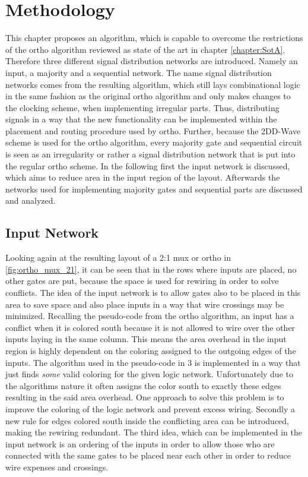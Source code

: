 \chapter{Methodology}\label{chapter:Methodology}
This chapter proposes an algorithm, which is capable to overcome the restrictions of the ortho algorithm reviewed as state of the art in chapter \ref{chapter:SotA}. Therefore three different signal distribution networks are introduced. Namely an input, a majority and a sequential network. The name signal distribution networks comes from the resulting algorithm, which still lays combinational logic in the same fashion as the original ortho algorithm and only makes changes to the clocking scheme, when implementing irregular parts. Thus, distributing signals in a way that the new functionality can be implemented within the placement and routing procedure used by ortho. Further, because the 2DD-Wave scheme is used for the ortho algorithm, every majority gate and sequential circuit is seen as an irregularity or rather a signal distribution network that is put into the regular ortho scheme. In the following first the input network is discussed, which aims to reduce area in the input region of the layout. Afterwards the networks used for implementing majority gates and sequential parts are discussed and analyzed.

\section{Input Network}
Looking again at the resulting layout of a 2:1 mux or ortho in \ref{fig:ortho_mux_21}, it can be seen that in the rows where inputs are placed, no other gates are put, because the space is used for rewiring in order to solve conflicts. The idea of the input network is to allow gates also to be placed in this area to save space and also place inputs in a way that wire crossings may be minimized. Recalling the pseudo-code from the ortho algorithm, an input has a conflict when it is colored south because it is not allowed to wire over the other inputs laying in the same column. This means the area overhead in the input region is highly dependent on the coloring assigned to the outgoing edges of the inputs. The algorithm used in the pseudo-code in $3$ is implemented in a way that just finds \textit{some} valid coloring for the given logic network. Unfortunately due to the algorithms nature it often assigns the color south to exactly these edges resulting in the said area overhead. One approach to solve this problem is to improve the coloring of the logic network and prevent excess wiring. Secondly a new rule for edges colored south inside the conflicting area can be introduced, making the rewiring redundant. The third idea, which can be implemented in the input network is an ordering of the inputs in order to allow those who are connected with the same gates to be placed near each other in order to reduce wire expenses and crossings.

